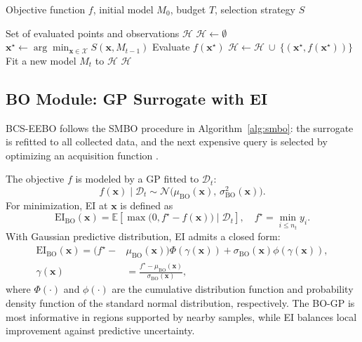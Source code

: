 \documentclass[lettersize,journal]{IEEEtran}
\newcommand{\Input}{\item[\textbf{Input:}]}
\newcommand{\Output}{\item[\textbf{Output:}]}
\begin{document}
\begin{algorithm}[t]
\caption{Generic Sequential Model-Based Optimization }
\label{alg:smbo}
\begin{algorithmic}[1]
\Input Objective function $f$, initial model $M_0$, budget $T$, selection strategy $S$
\Output Set of evaluated points and observations $\mathcal{H}$
\STATE $\mathcal{H} \leftarrow \emptyset$
    \STATE $\mathbf{x}^{\star} \leftarrow \arg\min_{\mathbf{x}\in\mathcal{X}} S(\mathbf{x}, M_{t-1})$
    \STATE Evaluate $f(\mathbf{x}^{\star})$ 
    \STATE $\mathcal{H} \leftarrow \mathcal{H}\ \cup\ \{(\mathbf{x}^{\star}, f(\mathbf{x}^{\star}))\}$
    \STATE Fit a new model $M_t$ to $\mathcal{H}$
\ENDFOR
\RETURN $\mathcal{H}$
\end{algorithmic}
\end{algorithm}

\subsection{BO Module: GP Surrogate with EI }
\label{subsec:bo}

BCS-EEBO follows the SMBO procedure in Algorithm~\ref{alg:smbo}: the surrogate is refitted to all collected data, and the next expensive query is selected by optimizing an acquisition function \cite{bergstra2011algorithms,Jones1998EGO,Shahriari2016ReviewBO}.

The objective $f$ is modeled by a GP fitted to $\mathcal{D}_t$:
\begin{equation}
\label{eq:bo_gp}
f(\mathbf{x})\mid \mathcal{D}_t \sim \mathcal{N}\!\bigl(\mu_{\mathrm{BO}}(\mathbf{x}),\,\sigma_{\mathrm{BO}}^2(\mathbf{x})\bigr).
\end{equation}
For minimization, EI at $\mathbf{x}$ is defined as
\begin{equation}
\label{eq:ei_def}
\mathrm{EI}_{\mathrm{BO}}(\mathbf{x})=
\mathbb{E}\!\left[\max\!\bigl(0, f^\star - f(\mathbf{x})\bigr)\mid \mathcal{D}_t\right],
\quad f^\star=\min_{i\le n_t} y_i.
\end{equation}
With Gaussian predictive distribution, EI admits a closed form:
\begin{equation}
\begin{aligned}
\label{eq:ei_closed}
\mathrm{EI}_{\mathrm{BO}}(\mathbf{x})
=
\bigl(f^\star-&\mu_{\mathrm{BO}}(\mathbf{x})\bigr)\Phi(\gamma(\mathbf{x}))
+
\sigma_{\mathrm{BO}}(\mathbf{x})\phi(\gamma(\mathbf{x})),\\
\gamma(\mathbf{x})&=
\frac{f^\star-\mu_{\mathrm{BO}}(\mathbf{x})}{\sigma_{\mathrm{BO}}(\mathbf{x})},
\end{aligned}
\end{equation}
where $\Phi(\cdot)$ and $\phi(\cdot)$ are the cumulative distribution function and probability density function of the standard normal distribution, respectively. The BO-GP is most informative in regions supported by nearby samples, while EI balances local improvement against predictive uncertainty.
\end{document}
